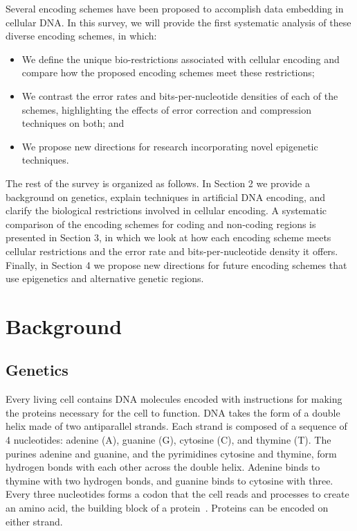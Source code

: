 \documentclass{bioinfo}
\begin{document}
Several encoding schemes have been proposed to accomplish data embedding in cellular DNA. In this survey, we will provide the first systematic analysis of these diverse encoding schemes, in which:
\begin{itemize}
\item We define the unique bio-restrictions associated with cellular encoding and compare how the proposed encoding schemes meet these restrictions;
\item We contrast the error rates and bits-per-nucleotide densities of each of the schemes, highlighting the effects of error correction and compression techniques on both; and
\item We propose new directions for research incorporating novel epigenetic techniques.
\end{itemize}

The rest of the survey is organized as follows. In Section 2 we provide a background on genetics, explain techniques in artificial DNA encoding, and clarify the biological restrictions involved in cellular encoding. A systematic comparison of the encoding schemes for coding and non-coding regions is presented in Section 3, in which we look at how each encoding scheme meets cellular restrictions and the error rate and bits-per-nucleotide density it offers. Finally, in Section 4 we propose new directions for future encoding schemes that use epigenetics and alternative genetic regions.


\section{Background}

\subsection{Genetics}

Every living cell contains DNA molecules encoded with instructions for making the proteins necessary for the cell to function. DNA takes the form of a double helix made of two antiparallel strands. Each strand is composed of a sequence of 4 nucleotides: adenine (A), guanine (G), cytosine (C), and thymine (T). The purines adenine and guanine, and the pyrimidines cytosine and thymine, form hydrogen bonds with each other across the double helix. Adenine binds to thymine with two hydrogen bonds, and guanine binds to cytosine with three. Every three nucleotides forms a codon that the cell reads and processes to create an amino acid, the building block of a protein~\cite{WC1953N}. Proteins can be encoded on either strand.
\end{document}
